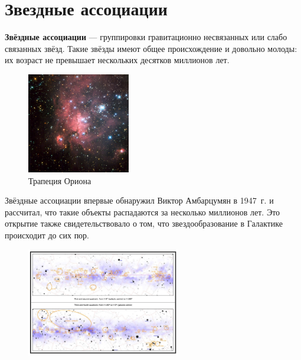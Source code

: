 \documentclass{beamer}
\begin{document}
    \section{Звездные ассоциации}
    \begin{frame}
        \textbf{Звёздные ассоциации} --- группировки гравитационно несвязанных или слабо связанных звёзд. 
        Такие звёзды имеют общее происхождение и довольно молоды: их возраст не превышает нескольких десятков миллионов лет.
        \begin{figure}
            \centering
            \includegraphics[width=0.4\textwidth]{pictures/Ass1.jpg}
            \caption{Трапеция Ориона}
        \end{figure}
    \end{frame}
    \begin{frame}
        Звёздные ассоциации впервые обнаружил Виктор Амбарцумян в 1947~г. и рассчитал, что такие объекты распадаются за несколько миллионов лет. 
        Это открытие также свидетельствовало о том, что звездообразование в Галактике происходит до сих пор.
        \begin{figure}
            \centering
            \includegraphics[width=0.6\textwidth]{pictures/Ass2.jpg}
        \end{figure}
    \end{frame}
\end{document}
